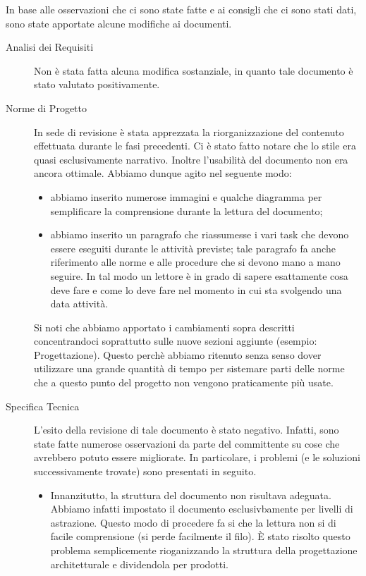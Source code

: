 		In base alle osservazioni che ci sono state fatte e ai consigli che ci sono stati dati, sono state apportate alcune modifiche ai documenti.
		\begin{description}
			\item[Analisi dei Requisiti] Non è stata fatta alcuna modifica sostanziale, in quanto tale documento è stato valutato positivamente.
			\item[Norme di Progetto] In sede di revisione è stata apprezzata la riorganizzazione del contenuto effettuata durante le fasi precedenti. Ci è stato fatto notare che lo stile era quasi esclusivamente narrativo. Inoltre l'usabilità del documento non era ancora ottimale. Abbiamo dunque agito nel seguente modo:
			\begin{itemize}
				\item abbiamo inserito numerose immagini e qualche diagramma per semplificare la comprensione durante la lettura del documento;
				\item abbiamo inserito un paragrafo che riassumesse i vari task che devono essere eseguiti durante le attività previste; tale paragrafo fa anche riferimento alle norme e alle procedure che si devono mano a mano seguire. In tal modo un lettore è in grado di sapere esattamente cosa deve fare e come lo deve fare nel momento in cui sta svolgendo una data attività.
			\end{itemize}
			Si noti che abbiamo apportato i cambiamenti sopra descritti concentrandoci soprattutto sulle nuove sezioni aggiunte (esempio: Progettazione). Questo perchè abbiamo ritenuto senza senso dover utilizzare una grande quantità di tempo per sistemare parti delle norme che a questo punto del progetto non vengono praticamente più usate.
			\item[Specifica Tecnica] L'esito della revisione di tale documento è stato negativo. Infatti, sono state fatte numerose osservazioni da parte del committente su cose che avrebbero potuto essere migliorate. In particolare, i problemi (e le soluzioni successivamente trovate) sono presentati in seguito.
			\begin{itemize}
				\item Innanzitutto, la struttura del documento non risultava adeguata. Abbiamo infatti impostato il documento esclusivbamente per livelli di astrazione. Questo modo di procedere fa si che la lettura non si di facile comprensione (si perde facilmente il filo). È stato risolto questo problema semplicemente rioganizzando la struttura della progettazione architetturale e dividendola per prodotti.

\end{itemize}
\end{description}
